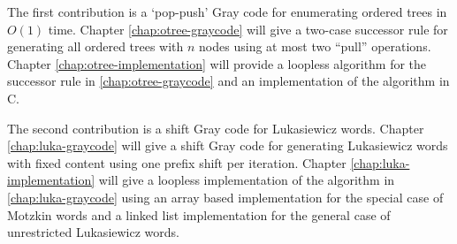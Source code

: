 The first contribution is a `pop-push' Gray code for enumerating ordered trees in $O(1)$ time. Chapter \ref{chap:otree-graycode} will give a two-case successor rule for generating all ordered trees with $n$ nodes using at most two ``pull'' operations. Chapter \ref{chap:otree-implementation} will provide a loopless algorithm for the successor rule in \ref{chap:otree-graycode} and an implementation of the algorithm in C.

The second contribution is a shift Gray code for Lukasiewicz words.  Chapter \ref{chap:luka-graycode} will give a shift Gray code for generating Lukasiewicz words with fixed content using one prefix shift per iteration.  Chapter \ref{chap:luka-implementation} will give a loopless implementation of the algorithm in \ref{chap:luka-graycode} using an array based implementation for the special case of Motzkin words and a linked list implementation for the general case of unrestricted Lukasiewicz words.
